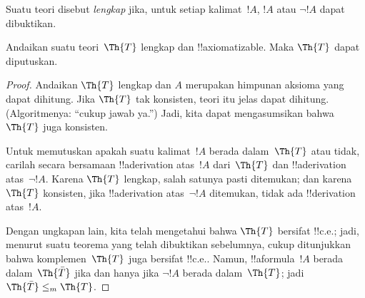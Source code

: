 \documentclass[../../../include/open-logic-section]{subfiles}
\begin{document}


Suatu teori disebut {\em lengkap} jika, untuk setiap kalimat~$!A$, $!A$
atau $\lnot !A$ dapat dibuktikan.

\begin{lem}
Andaikan suatu teori~$\Th{T}$ lengkap dan !!{axiomatizable}. Maka $\Th{T}$
dapat diputuskan.
\end{lem}

\begin{proof}
Andaikan $\Th{T}$ lengkap dan $A$ merupakan himpunan aksioma yang dapat
dihitung. Jika $\Th{T}$ tak konsisten, teori itu jelas dapat dihitung.
(Algoritmenya: ``cukup jawab ya.'') Jadi, kita dapat mengasumsikan bahwa
$\Th{T}$ juga konsisten.

Untuk memutuskan apakah suatu kalimat~$!A$ berada dalam~$\Th{T}$ atau tidak,
carilah secara bersamaan !!a{derivation} atas~$!A$ dari~$\Th{T}$ dan
!!a{derivation} atas~$\lnot !A$. Karena $\Th{T}$ lengkap, salah satunya pasti
ditemukan; dan karena $\Th{T}$ konsisten, jika !!a{derivation} atas~$\lnot !A$
ditemukan, tidak ada !!{derivation} atas~$!A$.

Dengan ungkapan lain, kita telah mengetahui bahwa $\Th{T}$ bersifat
!!{c.e.}; jadi, menurut suatu teorema yang telah dibuktikan sebelumnya, cukup
ditunjukkan bahwa komplemen~$\Th{T}$ juga bersifat !!{c.e.}. Namun,
!!a{formula}~$!A$ berada dalam~$\Th{\bar T}$ jika dan hanya jika $\lnot !A$
berada dalam~$\Th{T}$; jadi $\Th{\bar T} \leq_m \Th{T}$.
\end{proof}
\end{document}
